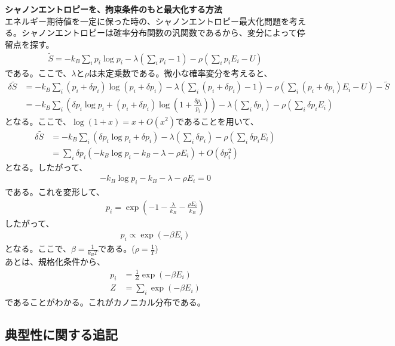 \documentclass[a4paper,11pt]{jsarticle}
\numberwithin{equation}{section}
\begin{document}
\textbf{シャノンエントロピーを、拘束条件のもと最大化する方法}\\
エネルギー期待値を一定に保った時の、シャノンエントロピー最大化問題を考える。シャノンエントロピーは確率分布関数の汎関数であるから、変分によって停留点を探す。
\begin{align}
  \tilde{S}= -k_B\sum_{i}p_i\log p_i -\lambda\left(\sum_{i}p_i - 1\right)-\rho\left(\sum_{i}p_iE_i - U\right)  
\end{align}
である。ここで、$\lambda$と$\rho$は未定乗数である。微小な確率変分を考えると、
\begin{align}
  \delta \tilde{S} &= -k_B\sum_{i}(p_i + \delta p_i)\log (p_i + \delta p_i) -\lambda\left(\sum_{i}(p_i + \delta p_i)- 1\right) -\rho\left(\sum_{i}(p_i + \delta p_i)E_i - U\right)-\tilde{S}\\
  &= -k_B\sum_{i}\left(\delta p_i\log p_i + (p_i + \delta p_i)\log \left(1 + \frac{\delta p_i}{p_i}\right)\right)  -\lambda\left(\sum_{i}\delta p_i\right)-\rho\left(\sum_{i}\delta p_iE_i\right)
\end{align}
となる。ここで、$\log(1+x) = x + O(x^2)$であることを用いて、
\begin{align}
  \delta \tilde{S} &= -k_B\sum_{i}\left(\delta p_i\log p_i + \delta p_i\right)  -\lambda\left(\sum_{i}\delta p_i\right)-\rho\left(\sum_{i}\delta p_iE_i\right)\\
  &= \sum_{i}\delta p_i\left(-k_B\log p_i - k_B - \lambda - \rho E_i\right) + O(\delta p_i^2)
\end{align}
となる。したがって、
\begin{align}
  -k_B\log p_i - k_B - \lambda - \rho E_i = 0
\end{align}
である。これを変形して、
\begin{align}
  p_i = \exp(-1-\frac{\lambda}{k_B}-\frac{\rho E_i}{k_B})
\end{align}
したがって、
\begin{align}
  p_i \propto \exp(-\beta E_i)
\end{align}
となる。ここで、$\beta = \frac{1}{k_B T}$である。($\rho = \frac{1}{T}$)\\
あとは、規格化条件から、
\begin{align}
    p_i &= \frac{1}{Z} \exp(-\beta E_i)\\
    Z &= \sum_{i} \exp(-\beta E_i)
\end{align}
であることがわかる。これがカノニカル分布である。\\


\subsection{典型性に関する追記}
\end{document}
